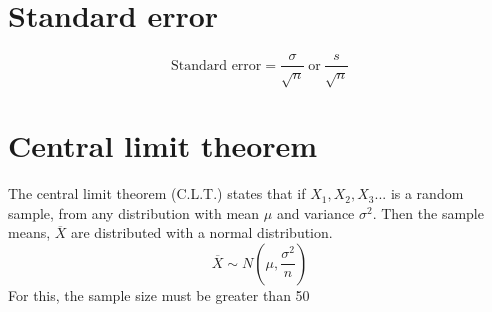 \documentclass{article}[18pt]
\begin{document}
\section{Standard error}
$$\textrm{Standard error}=\frac{\sigma}{\sqrt{n}} \ \textrm{or} \ \frac{s}{\sqrt{n}}$$
\section{Central limit theorem}
The central limit theorem (C.L.T.) states that if $X_1,X_2,X_3...$ is a random sample, from any distribution with mean $\mu$ and variance $\sigma^2$. Then the sample means, $\overline{X}$ are distributed with a normal distribution.
$$\overline{X}\sim N(\mu,\frac{\sigma^2}{n})$$ 
For this, the sample size must be greater than 50
\end{document}
